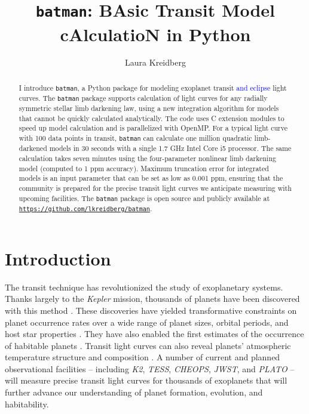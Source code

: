 \documentclass[12pt,preprint]{aastex}
\newcommand*{\blue}{\textcolor{blue}}
\begin{document}
\title{\texttt{batman}: BAsic Transit Model cAlculatioN in Python} 

\author{Laura Kreidberg}



\begin{abstract}
I introduce \texttt{batman}, a Python package for modeling exoplanet transit \blue{and eclipse} light curves.  The \texttt{batman} package supports calculation of light curves for any radially symmetric stellar limb darkening law, using a new integration algorithm for models that cannot be quickly calculated analytically.  The code uses C extension modules to speed up model calculation and is parallelized with OpenMP.  For a typical light curve with 100 data points in transit, \texttt{batman} can calculate one million quadratic limb-darkened models in 30 seconds with a single 1.7 GHz Intel Core i5 processor.  The same calculation takes seven minutes using the four-parameter nonlinear limb darkening model (computed to 1 ppm accuracy).  Maximum truncation error for integrated models is an input parameter that can be set as low as 0.001 ppm, ensuring that the community is prepared for the precise transit light curves we anticipate measuring with upcoming facilities.  The \texttt{batman} package is open source and publicly available at \texttt{\blue{\url{https://github.com/lkreidberg/batman}}}.
\end{abstract}


\section{Introduction}
The transit technique has revolutionized the study of exoplanetary systems.  Thanks largely to the \emph{Kepler} mission, thousands of planets have been discovered with this method \citep{rowe15}. These discoveries have yielded transformative constraints on planet occurrence rates over a wide range of planet sizes, orbital periods, and host star properties \citep{borucki11, youdin11, howard12,fressin13, dong13, morton14}. They have also enabled the first estimates of the occurrence of habitable planets \citep{traub12, dressing13, petigura13, kopparapu13, foremanmackey14, dressing15}.  Transit light curves can also reveal planets' atmospheric temperature structure and composition \citep[e.g.][]{seager00, charbonneau02, lecavelier08, sing11, deming13, knutson14a, fraine14, kreidberg15}.  A number of current and planned observational facilities -- including \emph{K2}, \emph{TESS}, \emph{CHEOPS}, \emph{JWST}, and \emph{PLATO} -- will measure precise transit light curves for thousands of exoplanets that will further advance our understanding of planet formation, evolution, and habitability.
\end{document}
